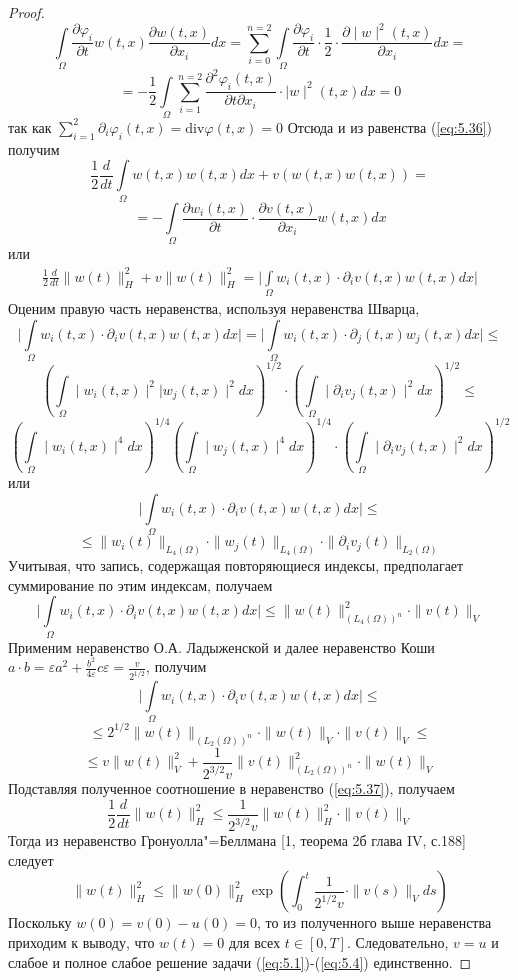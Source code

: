 \begin{proof}
    $$\int\limits_\Omega\frac{\partial \varphi_i}{\partial t}w(t, x)\frac{\partial w(t, x)}{\partial x_i}dx=
    \sum_{i=0}^{n=2}\int\limits_\Omega\frac{\partial \varphi _i}{\partial t}\cdot\frac{1}{2}\cdot\frac{\partial \mid w\mid^2(t, x)}{\partial x_i}dx=$$
    $$=-\frac{1}{2}\int\limits_\Omega\sum_{i=1}^{n=2}\frac{\partial^2 \varphi_i(t, x)}{\partial t\partial x_i}\cdot\mid w\mid^2(t, x)dx=0$$
    так как $\sum\limits_{i=1}^{2}\partial_i\varphi_i(t, x)= \textrm{div} \varphi(t, x)=0$
    Отсюда и из равенства (\ref{eq:5.36}) получим
    $$\frac{1}{2}\frac{d}{dt}\int\limits_\Omega w(t, x)w(t, x)dx+v(w(t, x)w(t, x))=$$
    $$=-\int\limits_\Omega\frac{\partial w_i(t, x)}{\partial t}\cdot\frac{\partial v(t, x)}{\partial x_i}w(t, x)dx$$
    или
    \begin{equation}\label{eq:5.37}
        \begin{gathered}
            \frac{1}{2}\frac{d}{dt}\| w(t)\|_H^2+v\| w(t)\|_H^2=
            \bigg|\int\limits_\Omega w_i(t, x)\cdot\partial_iv(t, x)w(t, x)dx\bigg|
        \end{gathered}
    \end{equation}
    Оценим правую часть неравенства, используя неравенства Шварца,
    $$\bigg|\int\limits_\Omega w_i(t, x)\cdot\partial_iv(t, x)w(t, x)dx\bigg|=
    \bigg|\int\limits_\Omega w_i(t, x)\cdot\partial_j(t, x)w_j(t, x)dx\bigg|\le$$
    $$\left(\int\limits_\Omega \mid w_i(t, x)\mid^2|w_j(t, x)\mid^2dx \right)^{1/2}
    \cdot\left(\int\limits_\Omega\mid\partial_iv_j(t, x) \mid^2dx \right)^{1/2}\le$$
    $$\left(\int\limits_\Omega \mid w_i(t, x)\mid^4dx\right)^{1/4}\left(\int\limits_\Omega \mid w_j(t, x)\mid^4dx\right)^{1/4}
    \cdot\left(\int\limits_\Omega\mid\partial_iv_j(t, x) \mid^2dx \right)^{1/2}$$
    или
    $$\bigg|\int\limits_\Omega w_i(t, x)\cdot\partial_iv(t, x)w(t, x)dx\bigg|\le$$
    $$\le\| w_i(t)\|_{L_4(\Omega)}\cdot\| w_j(t)\|_{L_4(\Omega)}\cdot\|\partial_iv_j(t)\|_{L_2(\Omega)}$$
    Учитывая, что запись, содержащая повторяющиеся индексы, предполагает суммирование по этим индексам, получаем
    $$\bigg|\int\limits_\Omega w_i(t, x)\cdot\partial_iv(t, x)w(t, x)dx\bigg|\le\| w(t)\|_{(L_4(\Omega))^n}^2\cdot\| v(t)\|_V$$
    Применим неравенство О.А. Ладыженской и далее неравенство Коши \linebreak
    $a\cdot b=\varepsilon a^2+\frac{b^2}{4\varepsilon}c\varepsilon=\frac{v}{2^{1/2}}$, получим
    $$\bigg|\int\limits_\Omega w_i(t, x)\cdot\partial_iv(t, x)w(t, x)dx\bigg|\le$$
    $$\le 2^{1/2}\| w(t)\|_{(L_2(\Omega))^n}\cdot\| w(t)\|_V\cdot\| v(t)\|_V\le$$
    $$\le v\| w(t)\|_V^2+\frac{1}{2^{3/2}v}\| v(t)\|_{(L_2(\Omega))^n}^2\cdot\| w(t)\|_V$$
    Подставляя полученное соотношение в неравенство (\ref{eq:5.37}), получаем
    $$\frac{1}{2}\frac{d}{dt}\| w(t)\|_H^2\le\frac{1}{2^{3/2}v}\| w(t)\|_H^2\cdot\| v(t)\|_V$$
    Тогда из неравенство Гронуолла"=Беллмана [1, теорема 2б глава IV, с.188] следует
    $$\| w(t)\|_H^2\le\| w(0)\|_H^2\exp\left(\int_0^t\frac{1}{2^{1/2}v}\cdot\| v(s)\|_Vds\right)$$
    Поскольку $w(0) = v(0)- u(0) = 0$, то из полученного выше неравенства приходим к выводу,
    что $w(t)=0$ для всех $t\in[0, T]$. Следовательно, $v=u$ и слабое и полное слабое решение задачи (\ref{eq:5.1})-(\ref{eq:5.4}) единственно.
\end{proof}
